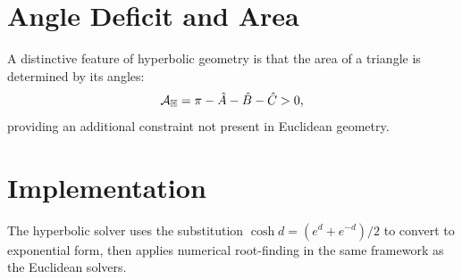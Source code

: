 \section{Angle Deficit and Area}
A distinctive feature of hyperbolic geometry is that the area of a triangle is determined by its angles:
\begin{equation}
\mathcal{A}_{\mathbb{H}} = \pi - \hat{A} - \hat{B} - \hat{C} > 0,
\end{equation}
providing an additional constraint not present in Euclidean geometry.

\section{Implementation}
The hyperbolic solver uses the substitution $\cosh d = (e^d + e^{-d})/2$ to convert to exponential form, then applies numerical root-finding in the same framework as the Euclidean solvers.

